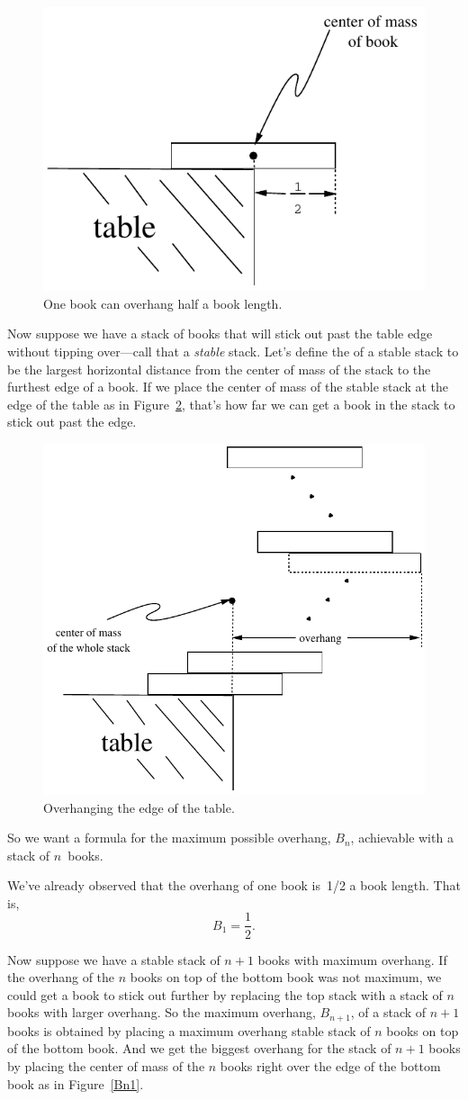 \begin{figure}[htbp]
\centerline{\includegraphics[width=.40\textwidth]{figures/bookstack-3}}
\caption{One book can overhang half a book length.}
\label{one-stable-book}
\end{figure}

Now suppose we have a stack of books that will stick out past the table
edge without tipping over---call that a \emph{stable} stack.  Let's define
the  of a stable stack to be the largest horizontal
distance from the center of mass of the stack to the furthest edge of a
book.  If we place the center of mass of the stable stack at the edge of
the table as in Figure~\ref{overhang}, that's how far we can get a book in
the stack to stick out past the edge.

\begin{figure}
\centerline{\includegraphics[width=.4\textwidth]{figures/bookstack-2}}
\caption{Overhanging the edge of the table.}
\label{overhang}
\end{figure}

So we want a formula for the maximum possible overhang, $B_n$, achievable
with a stack of $n$~books.

We've already observed that the overhang of one book is~1/2 a book
length.  That is,
\[
    B_1 = \frac{1}{2}.
\]

Now suppose we have a stable stack of $n+1$ books with maximum overhang.
If the overhang of the $n$ books on top of the bottom book was not
maximum, we could get a book to stick out further by replacing the top
stack with a stack of $n$ books with larger overhang.  So the maximum
overhang, $B_{n+1}$, of a stack of $n+1$ books is obtained by placing a
maximum overhang stable stack of $n$ books on top of the bottom book.  And
we get the biggest overhang for the stack of $n+1$ books by placing the
center of mass of the $n$ books right over the edge of the bottom book as
in Figure~\ref{Bn1}.


